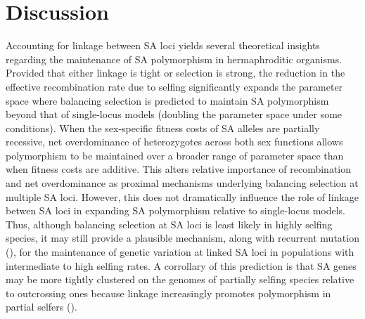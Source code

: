 \documentclass{article}
\begin{document}
\section*{Discussion}

Accounting for linkage between SA loci yields several theoretical insights regarding the maintenance of SA polymorphism in hermaphroditic organisms. Provided that either linkage is tight or selection is strong, the reduction in the effective recombination rate due to selfing significantly expands the parameter space where balancing selection is predicted to maintain SA polymorphism beyond that of single-locus models (doubling the parameter space under some conditions). When the sex-specific fitness costs of SA alleles are partially recessive, net overdominance of heterozygotes across both sex functions allows polymorphism to be maintained over a broader range of parameter space than when fitness costs are additive. This alters relative importance of recombination and net overdominance as proximal mechanisms underlying balancing selection at multiple SA loci. However, this does not dramatically influence the role of linkage betwen SA loci in expanding SA polymorphism relative to single-locus models. Thus, although balancing selection at SA loci is least likely in highly selfing species, it may still provide a plausible mechanism, along with recurrent mutation (\citealt{JordanConn2014}), for the maintenance of genetic variation at linked SA loci in populations with intermediate to high selfing rates. A corrollary of this prediction is that SA genes may be more tightly clustered on the genomes of partially selfing species relative to outcrossing ones because linkage increasingly promotes polymorphism in partial selfers (\citealt{Patten2010}).
\end{document}
